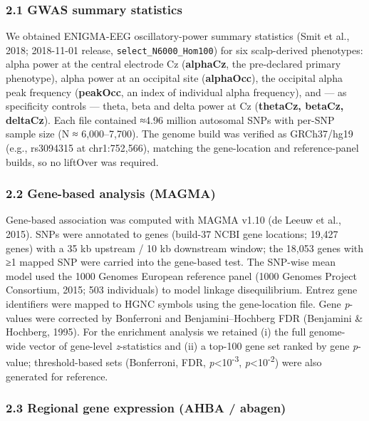 \documentclass[
  11pt,
  letterpaper,
]{article}
\begin{document}
\subsubsection{2.1 GWAS summary
statistics}\label{gwas-summary-statistics}

We obtained ENIGMA-EEG oscillatory-power summary statistics (Smit et
al., 2018; 2018-11-01 release, \texttt{select\_N6000\_Hom100}) for six
scalp-derived phenotypes: alpha power at the central electrode Cz
(\textbf{alphaCz}, the pre-declared primary phenotype), alpha power at
an occipital site (\textbf{alphaOcc}), the occipital alpha peak
frequency (\textbf{peakOcc}, an index of individual alpha frequency),
and --- as specificity controls --- theta, beta and delta power at Cz
(\textbf{thetaCz, betaCz, deltaCz}). Each file contained ≈4.96 million
autosomal SNPs with per-SNP sample size (N ≈ 6,000--7,700). The genome
build was verified as GRCh37/hg19 (e.g., rs3094315 at chr1:752,566),
matching the gene-location and reference-panel builds, so no liftOver
was required.

\subsubsection{2.2 Gene-based analysis
(MAGMA)}\label{gene-based-analysis-magma}

Gene-based association was computed with MAGMA v1.10 (de Leeuw et al.,
2015). SNPs were annotated to genes (build-37 NCBI gene locations;
19,427 genes) with a 35 kb upstream / 10 kb downstream window; the
18,053 genes with ≥1 mapped SNP were carried into the gene-based test.
The SNP-wise mean model used the 1000 Genomes European reference panel
(1000 Genomes Project Consortium, 2015; 503 individuals) to model
linkage disequilibrium. Entrez gene identifiers were mapped to HGNC
symbols using the gene-location file. Gene \emph{p}-values were
corrected by Bonferroni and Benjamini--Hochberg FDR (Benjamini \&
Hochberg, 1995). For the enrichment analysis we retained (i) the full
genome-wide vector of gene-level \emph{z}-statistics and (ii) a top-100
gene set ranked by gene \emph{p}-value; threshold-based sets
(Bonferroni, FDR, \emph{p}\textless10\textsuperscript{-3},
\emph{p}\textless10\textsuperscript{-2}) were also generated for
reference.

\subsubsection{2.3 Regional gene expression (AHBA /
abagen)}\label{regional-gene-expression-ahba-abagen}
\end{document}
